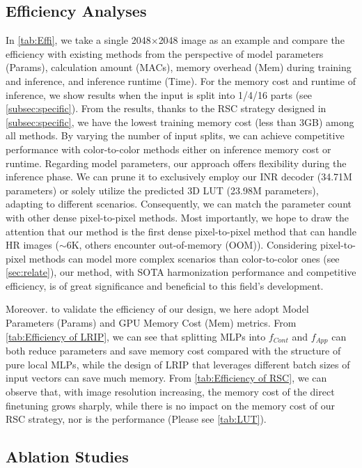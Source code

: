 \documentclass[10pt,journal,twocolumn,twoside]{IEEEtran}
\begin{document}
\subsection{Efficiency Analyses}
\label{subsec:efficiency}

In \cref{tab:Effi}, we take a single 2048$\times$2048 image as an example and compare the efficiency with existing methods from the perspective of model parameters (Params), calculation amount (MACs), memory overhead (Mem) during training and inference, and inference runtime (Time). For the memory cost and runtime of inference, we show results when the input is split into 1/4/16 parts (see \cref{subsec:specific}). From the results, thanks to the RSC strategy designed in \cref{subsec:specific}, we have the lowest training memory cost (less than 3GB) among all methods. By varying the number of input splits, we can achieve competitive performance with color-to-color methods either on inference memory cost or runtime. Regarding model parameters, our approach offers flexibility during the inference phase. We can prune it to exclusively employ our INR decoder (34.71M parameters) or solely utilize the predicted 3D LUT (23.98M parameters), adapting to different scenarios. Consequently, we can match the parameter count with other dense pixel-to-pixel methods. Most importantly, we hope to draw the attention that our method is the first dense pixel-to-pixel method that can handle HR images ($\sim$6K, others encounter out-of-memory (OOM)). Considering pixel-to-pixel methods can model more complex scenarios than color-to-color ones (see \cref{sec:relate}), our method, with SOTA harmonization performance and competitive efficiency, is of great significance and beneficial to this field's development.

Moreover. to validate the efficiency of our design, we here adopt Model Parameters (Params) and GPU Memory Cost (Mem) metrics. From \cref{tab:Efficiency of LRIP}, we can see that splitting MLPs into $f_{Cont}$ and $f_{App}$ can both reduce parameters and save memory cost compared with the structure of pure local MLPs, while the design of LRIP that leverages different batch sizes of input vectors can save much memory. From \cref{tab:Efficiency of RSC}, we can observe that, with image resolution increasing, the memory cost of the direct finetuning grows sharply, while there is no impact on the memory cost of our RSC strategy, nor is the performance (Please see \cref{tab:LUT}). 



\subsection{Ablation Studies}
\label{subsec:ablation}
\end{document}
